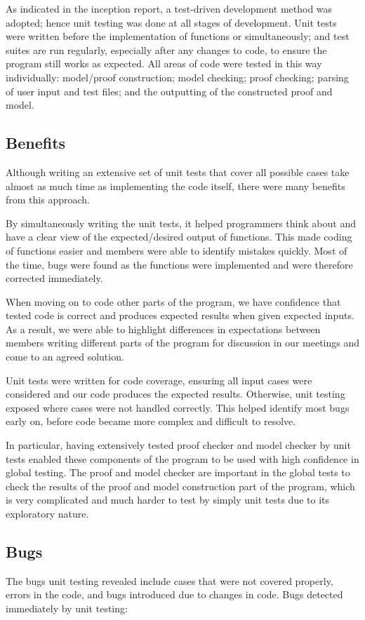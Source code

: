 As indicated in the inception report, a test-driven development method was adopted; hence unit testing was done at all stages of development. Unit tests were written before the implementation of functions or simultaneously; and test suites are run regularly, especially after any changes to code, to ensure the program still works as expected. All areas of code were tested in this way individually: model/proof construction; model checking; proof checking; parsing of user input and test files; and the outputting of the constructed proof and model.

\subsection*{Benefits}
Although writing an extensive set of unit tests that cover all possible cases take almost as much time as implementing the code itself, there were many benefits from this approach.

By simultaneously writing the unit tests, it helped programmers think about and have a clear view of the expected/desired output of functions. This made coding of functions easier and members were able to identify mistakes quickly. Most of the time, bugs were found as the functions were implemented and were therefore corrected immediately.

When moving on to code other parts of the program, we have confidence that tested code is correct and produces expected results when given expected inputs. As a result, we were able to highlight differences in expectations between members writing different parts of the program for discussion in our meetings and come to an agreed solution.

Unit tests were written for code coverage, ensuring all input cases were considered and our code produces the expected results. Otherwise, unit testing exposed where cases were not handled correctly. This helped identify most bugs early on, before code became more complex and difficult to resolve.

In particular, having extensively tested proof checker and model checker by unit tests enabled these components of the program to be used with high confidence in global testing. The proof and model checker are important in the global tests to check the results of the proof and model construction part of the program, which is very complicated and much harder to test by simply unit tests due to its exploratory nature.

\subsection*{Bugs}
The bugs unit testing revealed include cases that were not covered properly, errors in the code, and bugs introduced due to changes in code. Bugs detected immediately by unit testing:

